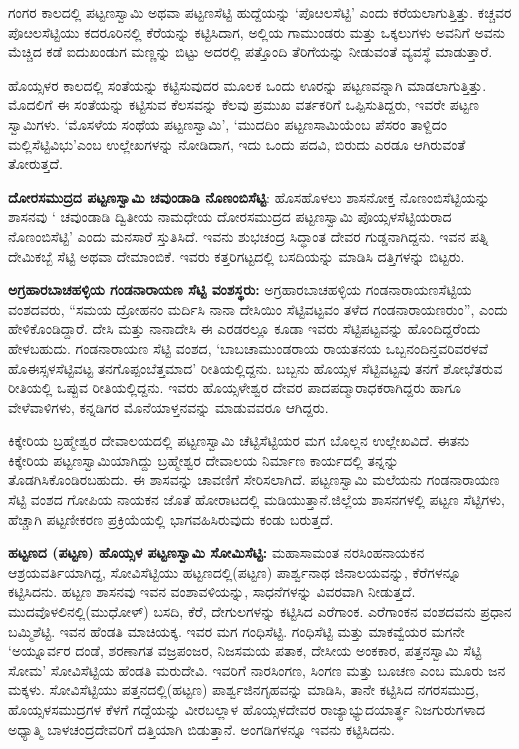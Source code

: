 ಗಂಗರ ಕಾಲದಲ್ಲಿ ಪಟ್ಟಣಸ್ವಾಮಿ ಅಥವಾ ಪಟ್ಟಣಸೆಟ್ಟಿ ಹುದ್ದೆಯನ್ನು ‘ಪೊೞಲಸೆಟ್ಟಿ’ ಎಂದು ಕರೆಯಲಾಗುತ್ತಿತ್ತು. ಕಚ್ಚವರ ಪೊೞಲಸೆಟ್ಟಿಯು ಕದರೂರಿನಲ್ಲಿ ಕೆರೆಯನ್ನು ಕಟ್ಟಿಸಿದಾಗ, ಅಲ್ಲಿಯ ಗಾಮುಂಡರು ಮತ್ತು ಒಕ್ಕಲುಗಳು ಅವನಿಗೆ ಅವನು ಮೆಚ್ಚಿದ ಕಡೆ ಐದುಖಂಡುಗ ಮಣ್ಣನ್ನು ಬಿಟ್ಟು ಅದರಲ್ಲಿ ಪತ್ತೊಂದಿ ತೆರಿಗೆಯನ್ನು ನೀಡುವಂತೆ ವ್ಯವಸ್ಥೆ ಮಾಡುತ್ತಾರೆ.

ಹೊಯ್ಸಳರ ಕಾಲದಲ್ಲಿ ಸಂತೆಯನ್ನು ಕಟ್ಟಿಸುವುದರ ಮೂಲಕ ಒಂದು ಊರನ್ನು ಪಟ್ಟಣವನ್ನಾಗಿ ಮಾಡಲಾಗುತ್ತಿತ್ತು. ಮೊದಲಿಗೆ ಈ ಸಂತೆಯನ್ನು ಕಟ್ಟಿಸುವ ಕೆಲಸವನ್ನು ಕೆಲವು ಪ್ರಮುಖ ವರ್ತಕರಿಗೆ ಒಪ್ಪಿಸುತಿದ್ದರು, ಇವರೇ ಪಟ್ಟಣ ಸ್ವಾಮಿಗಳು. ‘ಮೊಸಳೆಯ ಸಂಥೆಯ ಪಟ್ಟಣಸ್ವಾಮಿ’, ‘ಮುದದಿಂ ಪಟ್ಟಣಸಾಮಿಯೆಂಬ ಪೆಸರಂ ತಾಳ್ದಿದಂ ಮಲ್ಲಿಸೆಟ್ಟಿವಿಭು’ಎಂಬ ಉಲ್ಲೇಖಗಳನ್ನು ನೋಡಿದಾಗ, ಇದು ಒಂದು ಪದವಿ, ಬಿರುದು ಎರಡೂ ಆಗಿರುವಂತೆ ತೋರುತ್ತದೆ.

\textbf{ದೋರಸಮುದ್ರದ ಪಟ್ಟಣಸ್ವಾಮಿ ಚವುಂಡಾಡಿ ನೊಣಂಬಿಸೆಟ್ಟಿ}: ಹೊಸಹೊಳಲು ಶಾಸನೋಕ್ತ ನೊಣಂಬಿಸೆಟ್ಟಿಯನ್ನು ಶಾಸನವು ‘ ಚವುಂಡಾಡಿ ದ್ವಿತೀಯ ನಾಮಧೇಯ ದೋರಸಮುದ್ರದ ಪಟ್ಟಣಸ್ವಾಮಿ ಪೊಯ್ಸಳಸೆಟ್ಟಿಯರಾದ ನೊಣಂಬಿಸೆಟ್ಟಿ’ ಎಂದು ಮನಸಾರೆ ಸ್ತುತಿಸಿದೆ. ಇವನು ಶುಭಚಂದ್ರ ಸಿದ್ಧಾಂತ ದೇವರ ಗುಡ್ಡನಾಗಿದ್ದನು. ಇವನ ಪತ್ನಿ ದೇಮಿಕಬ್ಬೆ ಸೆಟ್ಟಿ ಅಥವಾ ದೇಮಾಂಬಿಕೆ. ಇವರು ಕತ್ತರಿಗಟ್ಟದಲ್ಲಿ ಬಸದಿಯನ್ನು ಮಾಡಿಸಿ ದತ್ತಿಗಳನ್ನು ಬಿಟ್ಟರು.

\textbf{ಅಗ್ರಹಾರಬಾಚಹಳ್ಳಿಯ ಗಂಡನಾರಾಯಣ ಸೆಟ್ಟಿ ವಂಶಸ್ಥರು: } ಅಗ್ರಹಾರಬಾಚಹಳ್ಳಿಯ ಗಂಡನಾರಾಯಣಸೆಟ್ಟಿಯ ವಂಶದವರು, “ಸಮಯ ದ್ರೋಹನಂ ಮರ್ದಿಸಿ ನಾನಾ ದೇಸಿಯಿಂ ಸೆಟ್ಟಿವಟ್ಟವಂ ತಳೆದ ಗಂಡನಾರಾಯಣರುಂ”, ಎಂದು ಹೇಳಿಕೊಂಡಿದ್ದಾರೆ. ದೇಸಿ ಮತ್ತು ನಾನಾದೇಸಿ ಈ ಎರಡರಲ್ಲೂ ಕೂಡಾ ಇವರು ಸೆಟ್ಟಿಪಟ್ಟವನ್ನು ಹೊಂದಿದ್ದರೆಂದು ಹೇಳಬಹುದು. ಗಂಡನಾರಾಯಣ ಸೆಟ್ಟಿ ವಂಶದ, ‘ಬಾಬಚಾಮುಂಡರಾಯ ರಾಯತನಯ ಒಬ್ಬನಂದಿನ್ತವರಿವರಳವೆ ಹೊಈಸ್ಸಳಸೆಟ್ಟಿವಟ್ಟ ತನಗೊಪ್ಪಂಬೆತ್ತಮಾದ’ ರೀತಿಯಲ್ಲಿದ್ದನು. ಬಬ್ಬನು ಹೊಯ್ಸಳ ಸೆಟ್ಟಿವಟ್ಟವು ತನಗೆ ಶೋಭೆತರುವ ರೀತಿಯಲ್ಲಿ ಒಪ್ಪುವ ರೀತಿಯಲ್ಲಿದ್ದನು. ಇವರು ಹೊಯ್ಸಳೇಶ್ವರ ದೇವರ ಪಾದಪದ್ಮಾರಾಧಕರಾಗಿದ್ದರು ಹಾಗೂ ವೇಳೆವಾಳಿಗಳು, ಕನ್ನಡಿಗರ ಮೊನೆಯಾಳ್ತನವನ್ನು ಮಾಡುವವರೂ ಆಗಿದ್ದರು.

ಕಿಕ್ಕೇರಿಯ ಬ್ರಹ್ಮೇಶ್ವರ ದೇವಾಲಯದಲ್ಲಿ ಪಟ್ಟಣಸ್ವಾಮಿ ಚೆಟ್ಟಿಸೆಟ್ಟಿಯರ ಮಗ ಬೊಲ್ಲನ ಉಲ್ಲೇಖವಿದೆ. ಈತನು ಕಿಕ್ಕೇರಿಯ ಪಟ್ಟಣಸ್ವಾಮಿಯಾಗಿದ್ದು ಬ್ರಹ್ಮೇಶ್ವರ ದೇವಾಲಯ ನಿರ್ಮಾಣ ಕಾರ್ಯದಲ್ಲಿ ತನ್ನನ್ನು ತೊಡಗಿಸಿಕೊಂಡಿರಬಹುದು. ಈ ಶಾಸವನ್ನು ಚಾವಣಿಗೆ ಸೇರಿಸಲಾಗಿದೆ. ಪಟ್ಟಣಸ್ವಾಮಿ ಮಲೆಯನು ಗಂಡನಾರಾಯಣ ಸೆಟ್ಟಿ ವಂಶದ ಗೋಪಿಯ ನಾಯಕನ ಜೊತೆ ಹೋರಾಟದಲ್ಲಿ ಮಡಿಯುತ್ತಾನೆ.ಜಿಲ್ಲೆಯ ಶಾಸನಗಳಲ್ಲಿ ಪಟ್ಟಣ ಸೆಟ್ಟಿಗಳು, ಹೆಚ್ಚಾಗಿ ಪಟ್ಟಣೀಕರಣ ಪ್ರಕ್ರಿಯೆಯಲ್ಲಿ ಭಾಗವಹಿಸಿರುವುದು ಕಂಡು ಬರುತ್ತದೆ.

\textbf{ಹಟ್ಟಣದ (ಪಟ್ಟಣ) ಹೊಯ್ಸಳ ಪಟ್ಟಣಸ್ವಾಮಿ ಸೋಮಿಸೆಟ್ಟಿ: } ಮಹಾಸಾಮಂತ ನರಸಿಂಹನಾಯಕನ ಆಶ್ರಯವರ್ತಿಯಾಗಿದ್ದ, ಸೋವಿಸೆಟ್ಟಿಯು ಹಟ್ಟಣದಲ್ಲಿ(ಪಟ್ಟಣ) ಪಾರ್ಶ್ವನಾಥ ಜಿನಾಲಯವನ್ನು, ಕೆರೆಗಳನ್ನೂ ಕಟ್ಟಿಸಿದನು. ಹಟ್ಟಣ ಶಾಸನವು ಇವನ ವಂಶಾವಳಿಯನ್ನು, ಸಾಧನೆಗಳನ್ನು ವಿವರವಾಗಿ ನೀಡುತ್ತದೆ. ಮುದವೊಳಲಿನಲ್ಲಿ(ಮುಧೋಳ್​) ಬಸದಿ, ಕೆರೆ, ದೇಗುಲಗಳನ್ನು ಕಟ್ಟಿಸಿದ ಎರೆಗಾಂಕ. ಎರೆಗಾಂಕನ ವಂಶದವನು ಪ್ರಧಾನ ಬಮ್ಮಿಶೆಟ್ಟಿ. ಇವನ ಹೆಂಡತಿ ಮಾಚಿಯಕ್ಕ. ಇವರ ಮಗ ಗಂಧಿಸೆಟ್ಟಿ. ಗಂಧಿಸೆಟ್ಟಿ ಮತ್ತು ಮಾಕವ್ವೆಯರ ಮಗನೇ ‘ಅಯ್ನೂರ್ವರ ದಂಡೆ, ಶರಣಾಗತ ವಜ್ರಪಂಜರ, ನಿಜಸಮಯ ಪತಾಕ, ದೇಸೀಯ ಅಂಕಕಾರ, ಪತ್ತನಸ್ವಾಮಿ ಸೆಟ್ಟಿ ಸೋಮ’ ಸೋವಿಸೆಟ್ಟಿಯ ಹೆಂಡತಿ ಮರುದೇವಿ. ಇವರಿಗೆ ನಾರಸಿಂಗಣ, ಸಿಂಗಣ ಮತ್ತು ಬೂಚಣ ಎಂಬ ಮೂರು ಜನ ಮಕ್ಕಳು. ಸೋವಿಸೆಟ್ಟಿಯು ಪತ್ತನದಲ್ಲಿ(ಹಟ್ಟಣ) ಪಾರ್ಶ್ವಜಿನಗೃಹವನ್ನು ಮಾಡಿಸಿ, ತಾನೇ ಕಟ್ಟಿಸಿದ ನಗರಸಮುದ್ರ, ಹೊಯ್ಸಳಸಮುದ್ರಗಳ ಕೆಳಗೆ ಗದ್ದೆಯನ್ನು ವೀರಬಲ್ಲಾಳ ಹೊಯ್ಸಳದೇವರ ರಾಜ್ಯಾಭ್ಯುದಯಾರ್ತ್ಥ ನಿಜಗುರುಗಳಾದ ಅಧ್ಯಾತ್ಮಿ ಬಾಳಚಂದ್ರದೇವರಿಗೆ ದತ್ತಿಯಾಗಿ ಬಿಡುತ್ತಾನೆ. ಅಂಗಡಿಗಳನ್ನೂ ಇವನು ಕಟ್ಟಿಸಿದನು.

